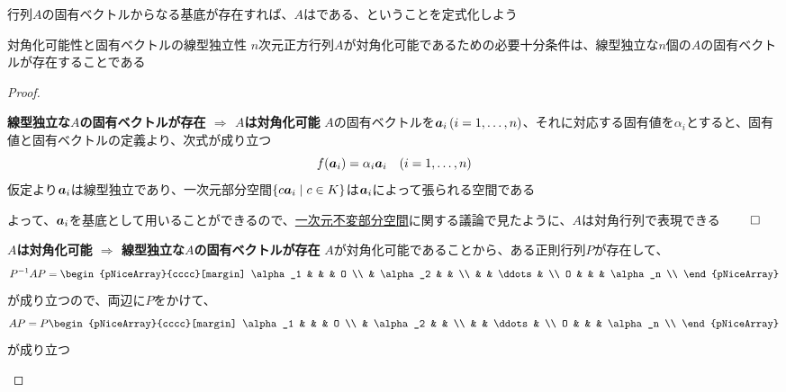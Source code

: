 \documentclass[../../../topic_linear-algebra]{subfiles}
\begin{document}
\sectionline

行列$A$の固有ベクトルからなる基底が存在すれば、$A$はである、ということを定式化しよう

\begin{theorem}{対角化可能性と固有ベクトルの線型独立性}\label{thm:diagonalizable-iff-n-indep-eigenvectors}
  $n$次元正方行列$A$が対角化可能であるための必要十分条件は、線型独立な$n$個の$A$の固有ベクトルが存在することである
\end{theorem}

\begin{proof}
  \begin{subpattern}{\bfseries 線型独立な$A$の固有ベクトルが存在 $\Longrightarrow$ $A$は対角化可能}
    $A$の固有ベクトルを$\vb*{a}_i \, (i = 1, \dots, n)$、それに対応する固有値を$\alpha_i$とすると、固有値と固有ベクトルの定義より、次式が成り立つ
    \begin{equation*}
      f(\vb*{a}_i) = \alpha_i \vb*{a}_i \quad (i = 1, \dots, n)
    \end{equation*}
    仮定より$\vb*{a}_i$は線型独立であり、一次元部分空間$\{ c \vb*{a}_i \mid c \in K \}$は$\vb*{a}_i$によって張られる空間である

    よって、$\vb*{a}_i$を基底として用いることができるので、\hyperref[sec:1d-invariant-subspaces]{一次元不変部分空間}に関する議論で見たように、$A$は対角行列で表現できる $\qed$
  \end{subpattern}

  \begin{subpattern}{\bfseries $A$は対角化可能 $\Longrightarrow$ 線型独立な$A$の固有ベクトルが存在}
    $A$が対角化可能であることから、ある正則行列$P$が存在して、
    \begin{equation*}
      P^{-1}AP = \begin{pNiceArray}{cccc}[margin]
        \alpha_1 & & & O \\
        & \alpha_2 & & \\
        & & \ddots & \\
        O & & & \alpha_n \\
      \end{pNiceArray}
    \end{equation*}
    が成り立つので、両辺に$P$をかけて、
    \begin{equation*}
      AP = P \begin{pNiceArray}{cccc}[margin]
        \alpha_1 & & & O \\
        & \alpha_2 & & \\
        & & \ddots & \\
        O & & & \alpha_n \\
      \end{pNiceArray}
    \end{equation*}
    が成り立つ


\end{subpattern}
\end{proof}
\end{document}
